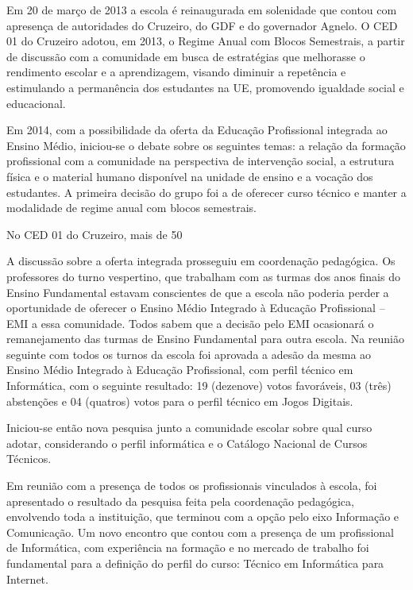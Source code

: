 Em 20 de março de 2013 a escola é reinaugurada em solenidade que contou com apresença de autoridades do Cruzeiro, do GDF e do governador Agnelo.
O CED 01 do Cruzeiro adotou, em 2013, o Regime Anual com Blocos Semestrais, a partir de discussão com a comunidade em busca de estratégias que melhorasse o rendimento escolar e a aprendizagem, visando diminuir a repetência e estimulando a permanência dos estudantes na UE, promovendo igualdade social e educacional.

Em 2014, com a possibilidade da oferta da Educação Profissional integrada ao Ensino Médio, iniciou-se o debate sobre os seguintes temas: a relação da formação profissional com a comunidade na perspectiva de intervenção social, a estrutura física e o material humano disponível na unidade de ensino e a vocação dos estudantes. A primeira decisão do grupo foi a de oferecer curso técnico e manter a modalidade de regime anual com blocos semestrais.

No CED 01 do Cruzeiro, mais de 50%

A discussão sobre a oferta integrada prosseguiu em coordenação pedagógica. Os professores do turno vespertino, que trabalham com as turmas dos anos finais do Ensino Fundamental estavam conscientes de que a escola não poderia perder a oportunidade de oferecer o Ensino Médio Integrado à Educação Profissional – EMI a essa comunidade. Todos sabem que a decisão pelo EMI ocasionará o remanejamento das turmas de Ensino Fundamental para outra escola. Na reunião seguinte com todos os turnos da escola foi aprovada a adesão da mesma ao Ensino Médio Integrado à Educação Profissional, com perfil técnico em Informática, com o seguinte resultado: 19 (dezenove) votos favoráveis, 03 (três) abstenções e 04 (quatros) votos para o perfil técnico em Jogos Digitais.

Iniciou-se então nova pesquisa junto a comunidade escolar sobre qual curso adotar, considerando o perfil informática e o Catálogo Nacional de Cursos Técnicos.

Em reunião com a presença de todos os profissionais vinculados à escola, foi apresentado o resultado da pesquisa feita pela coordenação pedagógica, envolvendo toda a instituição, que terminou com a opção pelo eixo Informação e Comunicação. Um novo encontro que contou com a presença de um profissional de Informática, com experiência na formação e no mercado de trabalho foi fundamental para a definição do perfil do curso: Técnico em Informática para Internet.

